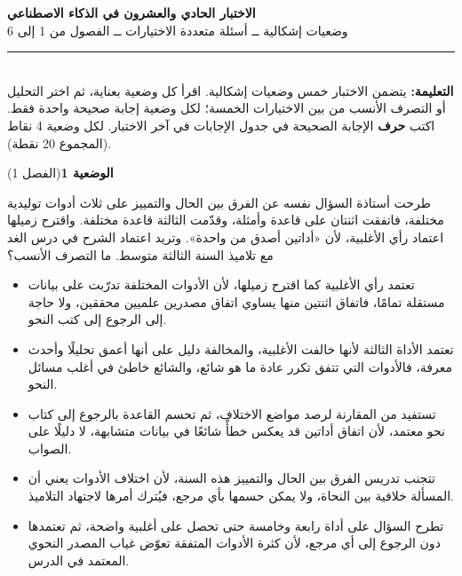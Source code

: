 \documentclass[11pt,a4paper]{article}
\begin{document}
\linespread{1.08}\selectfont
\begin{center}
{\LARGE\khatt\textbf{الاختبار الحادي والعشرون في الذكاء الاصطناعي}}\\[4pt]
{\normalsize وضعيات إشكالية ــ أسئلة متعددة الاختيارات ــ الفصول من 1 إلى 6}
\end{center}
\vspace{-2pt}\rule{\textwidth}{0.6pt}\\[2pt]
\textbf{التعليمة:} يتضمن الاختبار خمس وضعيات إشكالية. اقرأ كل وضعية بعناية، ثم اختر التحليل أو التصرف الأنسب
من بين الاختيارات الخمسة؛ لكل وضعية إجابة صحيحة واحدة فقط.
اكتب \textbf{حرف} الإجابة الصحيحة في جدول الإجابات في آخر الاختبار.
لكل وضعية 4 نقاط (المجموع 20 نقطة).
\vspace{4pt}

\noindent
{\large\khatt\textbf{الوضعية 1}}\hfill{\small(الفصل 1)}\par\nopagebreak\vspace{3pt}
\setlength{\fboxsep}{7pt}\colorbox{gray!10}{\parbox{\dimexpr\linewidth-14pt}{طرحت أستاذة السؤال نفسه عن الفرق بين الحال والتمييز على ثلاث أدوات توليدية مختلفة، فاتفقت اثنتان على قاعدة وأمثلة، وقدّمت الثالثة قاعدة مختلفة. واقترح زميلها اعتماد رأي الأغلبية، لأن «أداتين أصدق من واحدة». وتريد اعتماد الشرح في درس الغد مع تلاميذ السنة الثالثة متوسط. ما التصرف الأنسب؟}}\par\nopagebreak
\begin{itemize}[leftmargin=1.0cm, labelsep=6pt, itemsep=3pt, topsep=4pt, parsep=0pt]
  \item[\textbf{أ)}] تعتمد رأي الأغلبية كما اقترح زميلها، لأن الأدوات المختلفة تدرّبت على بيانات مستقلة تمامًا، فاتفاق اثنتين منها يساوي اتفاق مصدرين علميين محققين، ولا حاجة إلى الرجوع إلى كتب النحو.
  \item[\textbf{ب)}] تعتمد الأداة الثالثة لأنها خالفت الأغلبية، والمخالفة دليل على أنها أعمق تحليلًا وأحدث معرفة، فالأدوات التي تتفق تكرر عادة ما هو شائع، والشائع خاطئ في أغلب مسائل النحو.
  \item[\textbf{ج)}] تستفيد من المقارنة لرصد مواضع الاختلاف، ثم تحسم القاعدة بالرجوع إلى كتاب نحو معتمد، لأن اتفاق أداتين قد يعكس خطأً شائعًا في بيانات متشابهة، لا دليلًا على الصواب.
  \item[\textbf{د)}] تتجنب تدريس الفرق بين الحال والتمييز هذه السنة، لأن اختلاف الأدوات يعني أن المسألة خلافية بين النحاة، ولا يمكن حسمها بأي مرجع، فيُترك أمرها لاجتهاد التلاميذ.
  \item[\textbf{هـ)}] تطرح السؤال على أداة رابعة وخامسة حتى تحصل على أغلبية واضحة، ثم تعتمدها دون الرجوع إلى أي مرجع، لأن كثرة الأدوات المتفقة تعوّض غياب المصدر النحوي المعتمد في الدرس.
\end{itemize}
\end{document}
